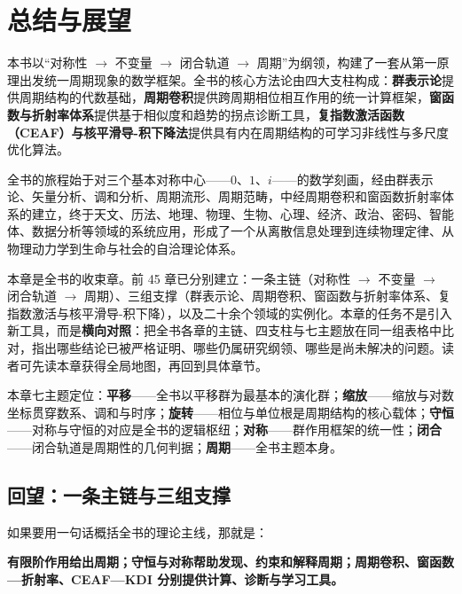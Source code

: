 \chapter{总结与展望}

本书以“对称性 $\to$ 不变量 $\to$ 闭合轨道 $\to$ 周期”为纲领，构建了一套从第一原理出发统一周期现象的数学框架。全书的核心方法论由四大支柱构成：\textbf{群表示论}提供周期结构的代数基础，\textbf{周期卷积}提供跨周期相位相互作用的统一计算框架，\textbf{窗函数与折射率体系}提供基于相似度和趋势的拐点诊断工具，\textbf{复指数激活函数（CEAF）与核平滑导-积下降法}提供具有内在周期结构的可学习非线性与多尺度优化算法。

全书的旅程始于对三个基本对称中心——$0$、$1$、$i$——的数学刻画，经由群表示论、矢量分析、调和分析、周期流形、周期范畴，中经周期卷积和窗函数折射率体系的建立，终于天文、历法、地理、物理、生物、心理、经济、政治、密码、智能体、数据分析等领域的系统应用，形成了一个从离散信息处理到连续物理定律、从物理动力学到生命与社会的自洽理论体系。

\begin{remark}[本章定位]\label{rem:summary_chapter_positioning}
本章是全书的收束章。前 45 章已分别建立：一条主链（对称性 $\to$ 不变量 $\to$ 闭合轨道 $\to$ 周期）、三组支撑（群表示论、周期卷积、窗函数与折射率体系、复指数激活与核平滑导-积下降），以及二十余个领域的实例化。本章的任务不是引入新工具，而是\textbf{横向对照}：把全书各章的主链、四支柱与七主题放在同一组表格中比对，指出哪些结论已被严格证明、哪些仍属研究纲领、哪些是尚未解决的问题。读者可先读本章获得全局地图，再回到具体章节。

本章七主题定位：\textbf{平移}——全书以平移群为最基本的演化群；\textbf{缩放}——缩放与对数坐标贯穿数系、调和与时序；\textbf{旋转}——相位与单位根是周期结构的核心载体；\textbf{守恒}——对称与守恒的对应是全书的逻辑枢纽；\textbf{对称}——群作用框架的统一性；\textbf{闭合}——闭合轨道是周期性的几何判据；\textbf{周期}——全书主题本身。
\end{remark}

\section{回望：一条主链与三组支撑}

如果要用一句话概括全书的理论主线，那就是：

\begin{center}
\textbf{有限阶作用给出周期；守恒与对称帮助发现、约束和解释周期；周期卷积、窗函数—折射率、CEAF—KDI 分别提供计算、诊断与学习工具。}
\end{center}

